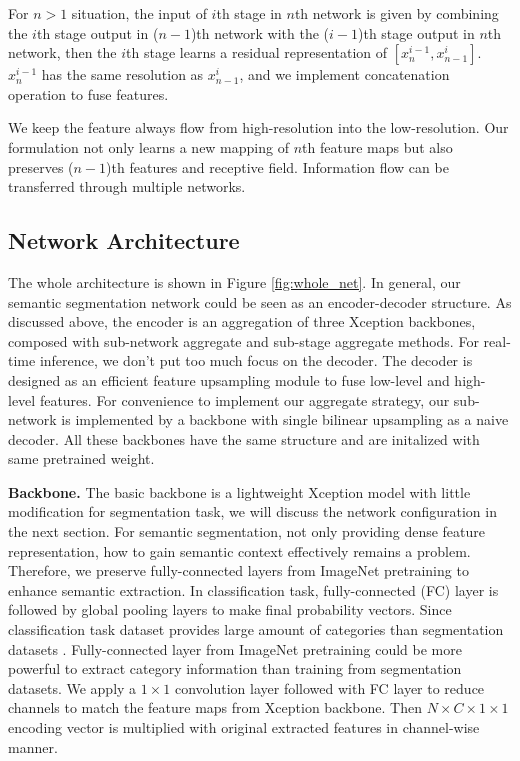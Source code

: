 \documentclass[10pt,twocolumn,letterpaper]{article}
\begin{document}
For $n > 1$ situation, the input of $i$th stage in $n$th network is given by combining the $i$th stage output in ($n-1$)th network with the ($i - 1$)th stage output in $n$th network, then the $i$th stage learns a residual representation of $[x_{n}^{i-1},x_{n-1}^{i}]$. $x_{n}^{i-1}$ has the same resolution as $x_{n-1}^{i}$, and we implement concatenation operation to fuse features.

We keep the feature always flow from high-resolution into the low-resolution.
Our formulation not only learns a new mapping of $n$th feature maps but also preserves ($n - 1$)th features and receptive field. Information flow can be transferred through multiple networks.

\subsection{Network Architecture}
\label{sec:fc}

The whole architecture is shown in Figure \ref{fig:whole_net}. In general, our semantic segmentation network could be seen as an encoder-decoder structure. As discussed above, the encoder is an aggregation of three Xception backbones, composed with sub-network aggregate and sub-stage aggregate methods. For real-time inference, we don't put too much focus on the decoder. The decoder is designed as an efficient feature upsampling module to fuse low-level and high-level features.
For convenience to implement our aggregate strategy, our sub-network is implemented by a backbone with single bilinear upsampling as a naive decoder.
All these backbones have the same structure and are initalized with same pretrained weight.

\textbf{Backbone.} The basic backbone is a lightweight Xception model with little modification for segmentation task, we will discuss the network configuration in the next section. For semantic segmentation, not only providing dense feature representation, how to gain semantic context effectively remains a problem. Therefore, we preserve fully-connected layers from ImageNet pretraining to enhance semantic extraction. 
In classification task, fully-connected (FC) layer is followed by global pooling layers to make final probability vectors. Since classification task dataset \cite{imagenet} provides large amount of categories than segmentation datasets \cite{VOC}\cite{ADE20K}. Fully-connected layer from ImageNet pretraining could be more powerful to extract category information than training from segmentation datasets. 
We apply a $1\times1$ convolution layer followed with FC layer to reduce channels to match the feature maps from Xception backbone. 
Then $N\times C\times1\times1$ encoding vector is multiplied with original extracted features in channel-wise manner.
\end{document}
